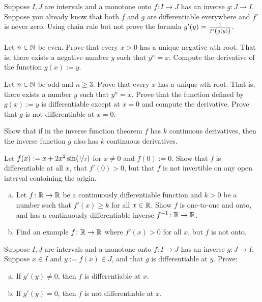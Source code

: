 \begin{exercise}
Suppose $I,J$ are intervals and a monotone onto $f \colon I \to J$ has an inverse $g \colon J \to I$.
Suppose you already know that both $f$ and $g$ are differentiable
everywhere and $f'$ is never zero.  Using chain rule but not  prove the
formula $g'(y) = \frac{1}{f'\left(\vphantom{1_1^1}g(y)\right)}$. %
\end{exercise}

\begin{exercise}
Let $n\in {\mathbb{N}}$ be even.
Prove that every $x > 0$ has a unique negative $n$th root.
That is, there exists a negative number $y$ such that $y^n = x$.
Compute the derivative
of the function $g(x) := y$.
\end{exercise}

\begin{exercise} \label{exercise:oddroot}
Let $n \in {\mathbb{N}}$ be odd and $n \geq 3$.
Prove that every $x$ has a unique $n$th root.
That is, there exists a number $y$ such that $y^n = x$.  Prove that
the function defined by $g(x) := y$ is differentiable except at $x=0$
and compute the derivative.  Prove that $g$ is not differentiable at $x=0$.
\end{exercise}

\begin{exercise}
Show that if in the inverse function theorem $f$ has $k$ continuous
derivatives, then the inverse function $g$ also has $k$ continuous
derivatives.
\end{exercise}

\begin{exercise}
Let $f(x) := x + 2 x^2 \sin(\nicefrac{1}{x})$ for $x \not= 0$ and
$f(0) := 0$.  Show that $f$ is differentiable at all $x$, that $f'(0) > 0$,
but that $f$ is not invertible
on any open interval containing the origin.
\end{exercise}

\begin{exercise}
\leavevmode
\begin{enumerate}[a)]
\item
Let $f \colon {\mathbb{R}} \to {\mathbb{R}}$ be a continuously differentiable function
and $k > 0$ be a number such that $f'(x) \geq k$ for all $x \in {\mathbb{R}}$.
Show $f$ is one-to-one and onto, and has a continuously differentiable
inverse $f^{-1} \colon {\mathbb{R}} \to {\mathbb{R}}$.
\item
Find an example $f \colon {\mathbb{R}} \to {\mathbb{R}}$
where $f'(x) > 0$
for all $x$, but $f$ is not onto.
\end{enumerate}
\end{exercise}

\begin{exercise}
Suppose $I,J$ are intervals and a monotone onto $f \colon I \to J$ has an inverse $g \colon J \to I$.
Suppose $x \in I$ and $y := f(x) \in J$, and that $g$ is differentiable at
$y$.  Prove:
\begin{enumerate}[a)]
\item
If $g'(y) \not= 0$, then $f$ is differentiable at $x$.
\item
If $g'(y) = 0$, then $f$ is not differentiable at $x$.
\end{enumerate}
\end{exercise}
